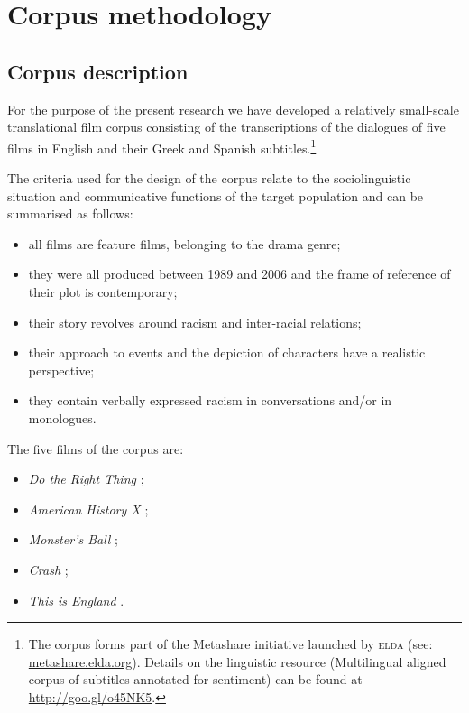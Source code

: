 \documentclass[output=paper]{LSP/langsci}
\begin{document}
\section{Corpus methodology} \label{sec:2:3}

\subsection{Corpus description} \label{sec:2:3:1}

For the purpose of the present research we have developed a relatively small-scale translational film corpus consisting of the transcriptions of the dialogues of five films in English and their Greek and Spanish subtitles.\footnote{The corpus forms part of the Metashare initiative launched by \textsc{elda} (see: \url{metashare.elda.org}). Details on the linguistic resource (Multilingual aligned corpus of subtitles annotated for sentiment) can be found at \url{http://goo.gl/o45NK5}.}

The criteria used for the design of the corpus relate to the sociolinguistic situation and communicative functions \citep[49--52]{Saridakis2010} of the target population and can be summarised as follows:

\begin{itemize}
\item all films are feature films, belonging to the drama genre;
\item they were all produced between 1989 and 2006 and the frame of reference of their plot is contemporary;
\item their story revolves around racism and inter-racial relations;
\item their approach to events and the depiction of characters have a realistic perspective;
\item they contain verbally expressed racism in conversations and/or in monologues.
\end{itemize}

The five films of the corpus are:

\begin{itemize}
\item \textit{Do the Right Thing} \citep{Lee1989};
\item \textit{American History X} \citep{Kaye1998};
\item \textit{Monster's Ball} \citep{Forster2001};
\item \textit{Crash} \citep{Haggis2004};
\item \textit{This is England} \citep{Meadows2006}.
\end{itemize}
\end{document}

